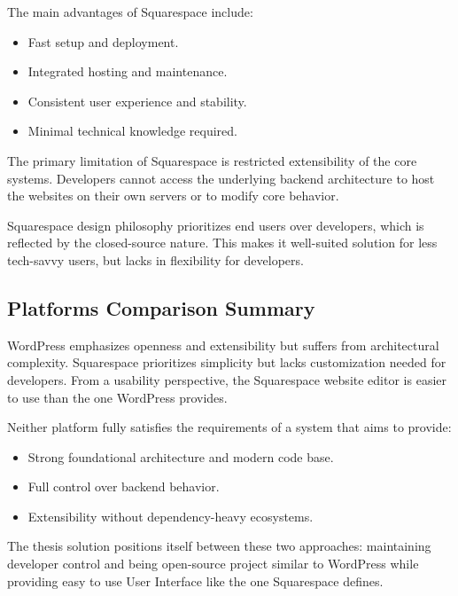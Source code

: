 The main advantages of Squarespace include:

\begin{itemize}
    \item Fast setup and deployment.
    \item Integrated hosting and maintenance.
    \item Consistent user experience and stability.
    \item Minimal technical knowledge required.
\end{itemize}

The primary limitation of Squarespace is restricted extensibility of the core systems.
Developers cannot access the underlying backend architecture to host the websites on their own servers or to modify
core behavior.

Squarespace design philosophy prioritizes end users over developers,
which is reflected by the closed-source nature.
This makes it well-suited solution for less tech-savvy users, but lacks in flexibility for developers.

\subsection{Platforms Comparison Summary}\label{subsec:platforms-comparison-summary}
WordPress emphasizes openness and extensibility but suffers from architectural complexity.
Squarespace prioritizes simplicity but lacks customization needed for developers.
From a usability perspective, the Squarespace website editor is easier to use than the one WordPress provides.

Neither platform fully satisfies the requirements of a system that aims to provide:

\begin{itemize}
    \item Strong foundational architecture and modern code base.
    \item Full control over backend behavior.
    \item Extensibility without dependency-heavy ecosystems.
\end{itemize}

The thesis solution positions itself between these two approaches:
maintaining developer control and being open-source project similar to WordPress
while providing easy to use User Interface like the one Squarespace defines.

